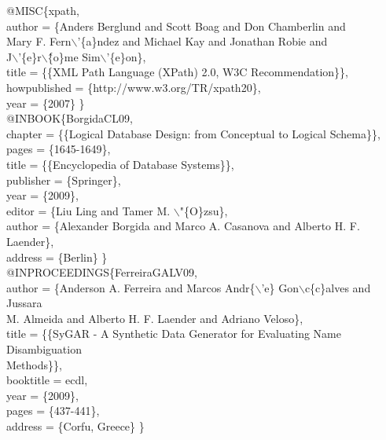 \documentclass[kdmile,a4paper]{kdmile} %
\newenvironment{latexcode}
{\ttfamily\vspace{0.1in}\setlength{\parindent}{18pt}}
{\vspace{0.1in}}
\begin{document}
\begin{latexcode}
@MISC\{xpath, \\\indent\indent
  author = \{Anders Berglund and Scott Boag and Don Chamberlin and \\\indent\indent
  Mary F. Fern$\backslash$'\{a\}ndez and Michael Kay  and Jonathan Robie and \\\indent\indent
  J$\backslash$'\{e\}r$\backslash$\^\{o\}me Sim$\backslash$'\{e\}on\},\\\indent\indent
  title = \{\{XML Path Language (XPath) 2.0, W3C Recommendation\}\},\\\indent\indent
  howpublished = \{http://www.w3.org/TR/xpath20\},\\\indent\indent
  year = \{2007\} \}\\

@INBOOK\{BorgidaCL09,\\\indent\indent
  chapter = \{\{Logical Database Design: from Conceptual to Logical Schema\}\},\\\indent\indent
  pages = \{1645-1649\},\\\indent\indent
  title = \{\{Encyclopedia of Database Systems\}\},\\\indent\indent
  publisher = \{Springer\},\\\indent\indent
  year = \{2009\},\\\indent\indent
  editor = \{Liu Ling and Tamer M. $\backslash$"\{O\}zsu\},\\\indent\indent
  author = \{Alexander Borgida and Marco A. Casanova and Alberto H. F. Laender\},\\\indent\indent
  address = \{Berlin\} \}\\

@INPROCEEDINGS\{FerreiraGALV09,\\\indent\indent
  author = \{Anderson A. Ferreira and Marcos Andr\{$\backslash$'e\} Gon$\backslash$c\{c\}alves and Jussara\\\indent\indent
	M. Almeida and Alberto H. F. Laender and Adriano Veloso\},\\\indent\indent
  title = \{\{SyGAR - A Synthetic Data Generator for Evaluating Name Disambiguation\\\indent\indent
	Methods\}\},\\\indent\indent
  booktitle = ecdl,\\\indent\indent
  year = \{2009\},\\\indent\indent
  pages = \{437-441\},\\\indent\indent
  address = \{Corfu, Greece\} \}\\


\end{latexcode}
\end{document}
